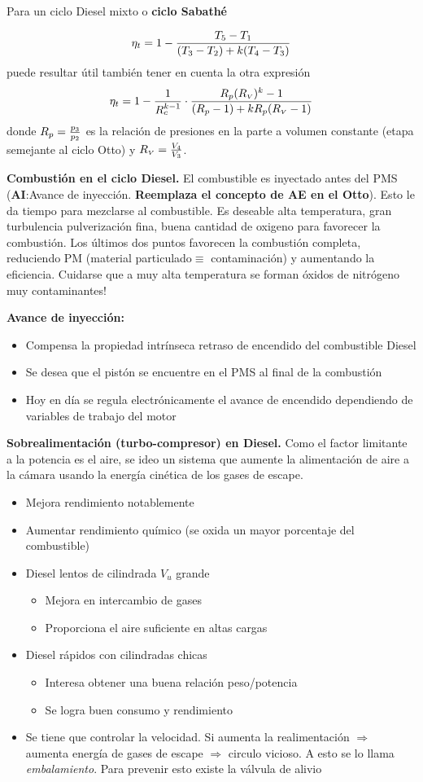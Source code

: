 Para un ciclo Diesel mixto o \textbf{ciclo Sabathé}

\[
\eta_t = 1- \frac{T_5-T_1}{(T_3-T_2)+k(T_4-T_3)}
\]
puede resultar útil también tener en cuenta la otra expresión
\[
\eta_t=1-\frac{1}{R_c^{k -1}}\cdot \frac{R_p({R_{\mbox{\tiny $V$}}})^k-1}{(R_p -1)+kR_p({R_{\mbox{\tiny $V$}}}-1)}\]
donde $R_p=\frac{p_3}{p_2}$ es la relación de presiones en la parte a volumen constante (etapa semejante al ciclo Otto) y ${R_{\mbox{\tiny $V$}}} = \frac{V_4}{V_3}$.

\textbf{Combustión en el ciclo Diesel.} El combustible es inyectado antes del PMS (\textbf{AI}:Avance de inyección. \textbf{Reemplaza el concepto de AE en el Otto}). Esto le da tiempo para mezclarse al combustible. Es deseable alta temperatura, gran turbulencia  pulverización fina, buena cantidad de oxigeno para favorecer la combustión. Los últimos dos puntos favorecen la combustión completa, reduciendo PM (material particulado$\equiv$ contaminación) y aumentando la eficiencia. Cuidarse que a muy alta temperatura se forman óxidos de nitrógeno muy contaminantes!

\textbf{Avance de inyección:} 
\begin{itemize}
    \item Compensa la propiedad intrínseca retraso de encendido del combustible Diesel
    \item Se desea que el pistón se encuentre en el PMS al final de la combustión
    \item Hoy en día se regula electrónicamente el avance de encendido dependiendo de variables de trabajo del motor
\end{itemize}

\textbf{Sobrealimentación (turbo-compresor) en Diesel.} Como el factor limitante a la potencia es el aire, se ideo un sistema que aumente la alimentación de aire a la cámara usando la energía cinética de los gases de escape.
\begin{itemize}
    \item Mejora rendimiento notablemente
    \item Aumentar rendimiento químico (se oxida un mayor porcentaje del combustible)
    \item Diesel lentos de cilindrada $V_u$ grande
    \begin{itemize}
        \item Mejora en intercambio de gases
        \item Proporciona el aire suficiente en altas cargas
    \end{itemize}
    \item Diesel rápidos con cilindradas chicas
    \begin{itemize}
        \item Interesa obtener una buena relación peso/potencia
        \item Se logra buen consumo y rendimiento
    \end{itemize}
    \item Se tiene que controlar la velocidad. Si aumenta la realimentación $\Rightarrow$ aumenta energía de gases de escape $\Rightarrow$ circulo vicioso. A esto se lo llama \textit{embalamiento}. Para prevenir esto existe la válvula de alivio
\end{itemize}

